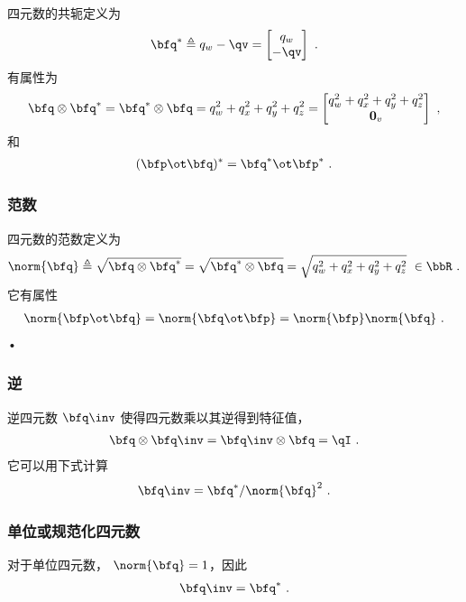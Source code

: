 四元数的共轭定义为
%
\begin{align}
\bfq^*\triangleq q_w-\qv=\begin{bmatrix}
q_w \\ -\qv
\end{bmatrix}
~.
\end{align}
%
有属性为
%
\begin{align}
\bfq\otimes\bfq^* = \bfq^*\otimes\bfq 
=q_w^2 +q_x^2 +q_y^2 +q_z^2
= \begin{bmatrix}
q_w^2 +q_x^2 +q_y^2 +q_z^2 \\ {\bf0}_v
\end{bmatrix}
~,
\end{align}
%
和
%
\begin{align}
(\bfp\ot\bfq)^* = \bfq^*\ot\bfp^* 
~.
\end{align}%


\subsubsection{范数}

四元数的范数定义为
%
\begin{align}\label{equ:q_norm}
\norm{\bfq} \triangleq \sqrt{\bfq\otimes\bfq^*} = \sqrt{\bfq^*\otimes\bfq} = \sqrt{q_w^2 +q_x^2 +q_y^2 +q_z^2 } ~\in \bbR ~.
\end{align}
%
它有属性
%
\begin{align}
\norm{\bfp\ot\bfq} = \norm{\bfq\ot\bfp} = \norm{\bfp}\norm{\bfq}~. \label{equ:norm_prod}
\end{align}•

\subsubsection{逆}

逆四元数 $\bfq\inv$ 使得四元数乘以其逆得到特征值，
%
\begin{align}
\bfq\otimes\bfq\inv = \bfq\inv\otimes\bfq = \qI~.
\end{align}
%
它可以用下式计算
%
\begin{align}
\bfq\inv = \bfq^*/\norm{\bfq}^2~.
\end{align}

\subsubsection{单位或规范化四元数}

对于单位四元数， $\norm{\bfq}=1$，因此
%
\begin{align}
\bfq\inv = \bfq^*~.
\end{align}


